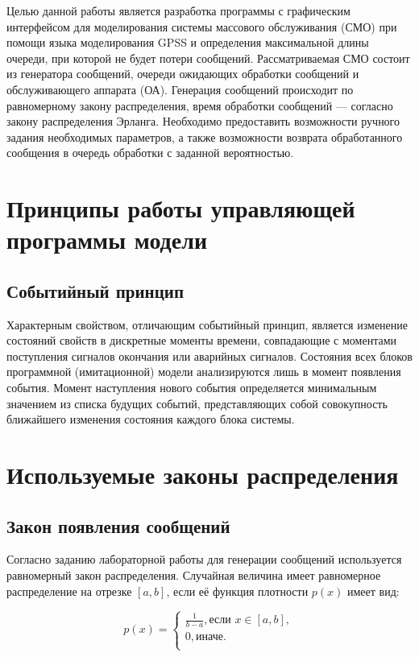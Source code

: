  Целью данной работы является разработка программы с графическим интерфейсом для моделирования системы массового обслуживания (СМО) при помощи  языка моделирования GPSS и определения максимальной длины очереди, при которой не будет потери сообщений. Рассматриваемая СМО состоит из генератора сообщений, очереди ожидающих обработки сообщений и обслуживающего аппарата (ОА). Генерация сообщений происходит по равномерному закону распределения, время обработки сообщений --- согласно закону распределения Эрланга. Необходимо предоставить возможности ручного задания необходимых параметров, а также возможности возврата обработанного сообщения в очередь обработки с заданной вероятностью.
 
\section*{Принципы работы управляющей программы модели}

\subsection*{Событийный принцип}

Характерным свойством, отличающим событийный принцип, является изменение состояний свойств в дискретные моменты времени, совпадающие с моментами поступления сигналов окончания или аварийных сигналов. 
Состояния всех блоков программной (имитационной) модели анализируются лишь в момент появления события.
Момент наступления нового события определяется минимальным значением из списка будущих событий, представляющих собой совокупность ближайшего изменения состояния каждого блока системы.

\section*{Используемые законы распределения}

\subsection*{Закон появления сообщений}

Согласно заданию лабораторной работы для генерации сообщений используется равномерный закон распределения.
Случайная величина имеет равномерное распределение на отрезке $[a, b]$, если её функция плотности $p(x)$ имеет вид:

\begin{equation}
	\label{for:equal-1}
    p(x) = 
    \begin{cases}
        \frac{1}{b - a}, \text{если } x \in [a, b],\\
        0, \text{иначе.} \\
    \end{cases}
\end{equation}

